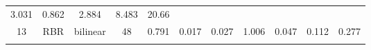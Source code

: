 \documentclass[twoside,12pt,final]{ucthesis-CA2012}
\begin{document}
\begin{ucmainmatter}
\begin{longtable}[]{@{}ccccccccccc@{}}
\begin{minipage}[t]{0.07\columnwidth}
3.031\strut
\end{minipage} & \begin{minipage}[t]{0.07\columnwidth}\centering\strut
0.862\strut
\end{minipage} & \begin{minipage}[t]{0.05\columnwidth}\centering\strut
2.884\strut
\end{minipage} & \begin{minipage}[t]{0.05\columnwidth}\centering\strut
8.483\strut
\end{minipage} & \begin{minipage}[t]{0.05\columnwidth}\centering\strut
20.66\strut
\end{minipage}\tabularnewline
\begin{minipage}[t]{0.04\columnwidth}\centering\strut
13\strut
\end{minipage} & \begin{minipage}[t]{0.11\columnwidth}\centering\strut
RBR\strut
\end{minipage} & \begin{minipage}[t]{0.06\columnwidth}\centering\strut
bilinear\strut
\end{minipage} & \begin{minipage}[t]{0.08\columnwidth}\centering\strut
48\strut
\end{minipage} & \begin{minipage}[t]{0.08\columnwidth}\centering\strut
0.791\strut
\end{minipage} & \begin{minipage}[t]{0.07\columnwidth}\centering\strut
0.017\strut
\end{minipage} & \begin{minipage}[t]{0.07\columnwidth}\centering\strut
0.027\strut
\end{minipage} & \begin{minipage}[t]{0.07\columnwidth}\centering\strut
1.006\strut
\end{minipage} & \begin{minipage}[t]{0.05\columnwidth}\centering\strut
0.047\strut
\end{minipage} & \begin{minipage}[t]{0.05\columnwidth}\centering\strut
0.112\strut
\end{minipage} & \begin{minipage}[t]{0.05\columnwidth}\centering\strut
0.277\strut
\end{minipage}\tabularnewline
\begin{minipage}[t]{0.04\columnwidth}\centering\strut

\end{minipage}
\end{longtable}
\end{ucmainmatter}
\end{document}
